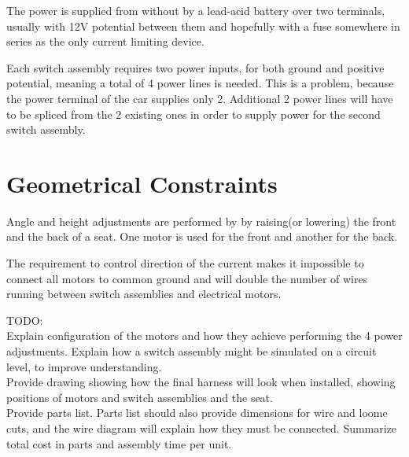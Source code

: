 \documentclass[12pt,letterpaper]{article}
\begin{document}
The power is supplied from without by a lead-acid battery over two terminals, usually with 12\si{\volt} potential between them and hopefully with a fuse somewhere in series as the only current limiting device. 

Each switch assembly requires two power inputs, for both ground and positive potential, meaning a total of 4 power lines is needed. This is a problem, because the power terminal of the car supplies only 2. Additional 2 power lines will have to be spliced from the 2 existing ones in order to supply power for the second switch assembly.

\newpage

\section{Geometrical Constraints}



Angle and height adjustments are performed by by raising(or lowering) the front and the back of a seat. One motor is used for the front and another for the back.




The requirement to control direction of the current makes it impossible to connect all motors to common ground and will double the number of wires running between switch assemblies and electrical motors.

TODO:\\
Explain configuration of the motors and how they achieve performing the 4 power adjustments.
Explain how a switch assembly might be simulated on a circuit level, to improve understanding.\\
Provide drawing showing how the final harness will look when installed, showing positions of motors and switch assemblies and the seat.\\
Provide parts list. Parts list should also provide dimensions for wire and loome cuts, and the wire diagram will explain how they must be connected.
Summarize total cost in parts and assembly time per unit.


\nopagebreak 
\begin{figure}[h]
\centering
\def\svgwidth{0.5\columnwidth}

\end{figure}
\clearpage
\end{document}
